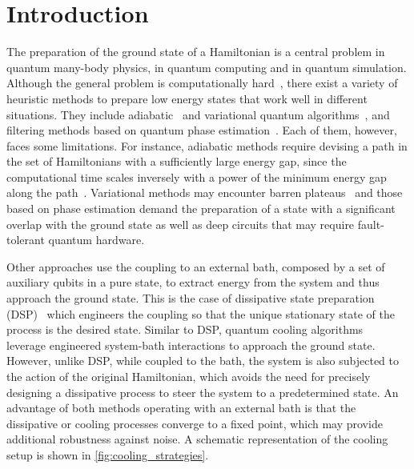 \documentclass[aps,prx,twocolumn,superscriptaddress,nofootinbib,nolongbibliography,nobalancelastpage,10pt,floatfix]{revtex4-2}
\begin{document}
\maketitle

\section{Introduction}
\label{sec:intro}

The preparation of the ground state of a Hamiltonian is a central problem in quantum many-body physics, in quantum computing and in quantum simulation. Although the general problem is computationally hard~\cite{Kempe2006Complexity}, there exist a variety of heuristic methods to prepare low energy states that work well in different situations. They include adiabatic~\cite{Albash2018Adiabatic} and variational quantum algorithms~\cite{Cerezo2021Variational}, and filtering methods based on quantum phase estimation~\cite{Poulin2009Preparing,Ge2019Faster,Lin2020Nearoptimal}.
Each of them, however, faces some limitations. For instance, adiabatic methods require devising a path in the set of Hamiltonians with a sufficiently large energy gap, since the computational time scales inversely with a power of the minimum energy gap along the path~\cite{Jansen2007Bounds}. Variational methods may encounter barren plateaus~\cite{McClean2018Barren} and those based on phase estimation demand the preparation of a state with a significant overlap with the ground state as well as deep circuits that may require fault-tolerant quantum hardware.

Other approaches use the coupling to an external bath, composed by a set of auxiliary qubits in a pure state, to extract energy from the system and thus approach the ground state. This is the case of dissipative state preparation (DSP)~\cite{Poyatos1996Quantum,Kraus2008Preparation,Diehl2008Quantum,Verstraete2009Quantuma} which engineers the coupling so that the unique stationary state of the process is the desired state. Similar to DSP, quantum cooling algorithms~\cite{Terhal2000Problem} leverage engineered system-bath interactions to approach the ground state. However, unlike DSP, while coupled to the bath, the system is also subjected to the action of the original Hamiltonian, which avoids the need for precisely designing a dissipative process to steer the system to a predetermined state. An advantage of both methods operating with an external bath is that the dissipative or cooling processes converge to a fixed point, which may provide additional robustness against noise.
A schematic representation of the cooling setup is shown in \cref{fig:cooling_strategies}.
\end{document}
